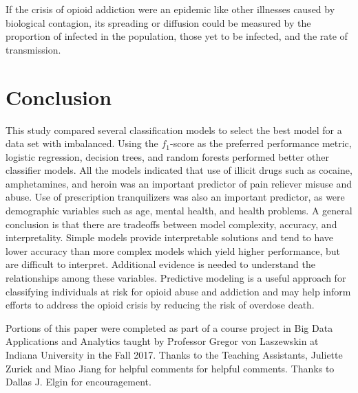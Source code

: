 \documentclass[sigconf]{acmart}
\begin{document}
If the crisis of opioid addiction were an epidemic like other illnesses caused 
by biological contagion, its spreading or diffusion could be measured by the 
proportion of infected in the population, those yet to be infected, and the 
rate of transmission. 

\section{Conclusion}

This study compared several classification models to select the best model for 
a data set with imbalanced. Using the $f_1$-score as the preferred performance 
metric, logistic regression, decision trees, and random forests performed better 
other classifier models. All the models indicated that use of illicit drugs 
such as cocaine, amphetamines, and heroin was an important predictor of pain 
reliever misuse and abuse. Use of prescription tranquilizers was also an 
important predictor, as were demographic variables such as age, mental health,
and health problems. A general conclusion is that there are tradeoffs between 
model complexity, accuracy, and interpretality. Simple models provide 
interpretable solutions and tend to have lower accuracy than more complex models
which yield higher performance, but are difficult to interpret. Additional 
evidence is needed to understand the relationships among these variables. 
Predictive modeling is a useful approach for classifying individuals at risk 
for opioid abuse and addiction and may help inform efforts to address the opioid 
crisis by reducing the risk of overdose death. 

\begin{acks}

Portions of this paper were completed as part of a course project in Big Data 
Applications and Analytics taught by Professor Gregor von Laszewskin at 
Indiana University in the Fall 2017. Thanks to the Teaching Assistants, 
Juliette Zurick and Miao Jiang for helpful comments for helpful comments. 
Thanks to Dallas J. Elgin for encouragement. 

\end{acks}

 

\appendix
\end{document}
